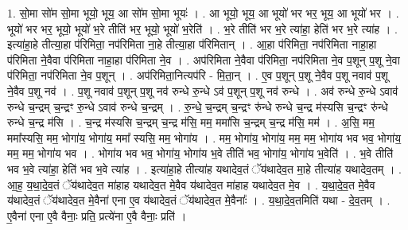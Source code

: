 \documentclass[17pt]{extarticle}
\begin{document}
1. सो॒मा सो॑म सो॒मा भूयो॒ भूय॒ आ सो॑म सो॒मा भूयः॑ । . आ भूयो॒ भूय॒ आ भूयो॑ भर भर॒ भूय॒ आ भूयो॑ भर । . भूयो॑ भर भर॒ भूयो॒ भूयो॑ भ॒रे तीति॑ भर॒ भूयो॒ भूयो॑ भ॒रेति॑ । . भ॒रे तीति॑ भर भ॒रे त्या॑हा॒ हेति॑ भर भ॒रे त्या॑ह । . इत्या॑हा॒हे तीत्या॒हा प॑रिमिता॒ नप॑रिमिता ना॒हे तीत्या॒हा प॑रिमितान् । . आ॒हा प॑रिमिता॒ नप॑रिमिता नाहा॒हा प॑रिमिता ने॒वैवा प॑रिमिता नाहा॒हा प॑रिमिता ने॒व । . अप॑रिमिता ने॒वैवा प॑रिमिता॒ नप॑रिमिता ने॒व प॒शून् प॒शू ने॒वा प॑रिमिता॒ नप॑रिमिता ने॒व प॒शून् । . अप॑रिमिता॒नित्यप॑रि - मि॒ता॒न् । . ए॒व प॒शून् प॒शू ने॒वैव प॒शू नवाव॑ प॒शू ने॒वैव प॒शू नव॑ । . प॒शू नवाव॑ प॒शून् प॒शू नव॑ रुन्धे रु॒न्धे ऽव॑ प॒शून् प॒शू नव॑ रुन्धे । . अव॑ रुन्धे रु॒न्धे ऽवाव॑ रुन्धे च॒न्द्रम् च॒न्द्रꣳ रु॒न्धे ऽवाव॑ रुन्धे च॒न्द्रम् । . रु॒न्धे॒ च॒न्द्रम् च॒न्द्रꣳ रु॑न्धे रुन्धे च॒न्द्र म॑स्यसि च॒न्द्रꣳ रु॑न्धे रुन्धे च॒न्द्र म॑सि । . च॒न्द्र म॑स्यसि च॒न्द्रम् च॒न्द्र म॑सि॒ मम॒ ममा॑सि च॒न्द्रम् च॒न्द्र म॑सि॒ मम॑ । . अ॒सि॒ मम॒ ममा᳚स्यसि॒ मम॒ भोगा॑य॒ भोगा॑य॒ ममा᳚ स्यसि॒ मम॒ भोगा॑य । . मम॒ भोगा॑य॒ भोगा॑य॒ मम॒ मम॒ भोगा॑य भव भव॒ भोगा॑य॒ मम॒ मम॒ भोगा॑य भव । . भोगा॑य भव भव॒ भोगा॑य॒ भोगा॑य भ॒वे तीति॑ भव॒ भोगा॑य॒ भोगा॑य भ॒वेति॑ । . भ॒वे तीति॑ भव भ॒वे त्या॑हा॒ हेति॑ भव भ॒वे त्या॑ह । . इत्या॑हा॒हे तीत्या॑ह यथादेव॒तं ॅय॑थादेव॒त मा॒हे तीत्या॑ह यथादेव॒तम् । . आ॒ह॒ य॒था॒दे॒व॒तं ॅय॑थादेव॒त मा॑हाह यथादेव॒त मे॒वैव य॑थादेव॒त मा॑हाह यथादेव॒त मे॒व । . य॒था॒दे॒व॒त मे॒वैव य॑थादेव॒तं ॅय॑थादेव॒त मे॒वैना॑ एना ए॒व य॑थादेव॒तं ॅय॑थादेव॒त मे॒वैनाः᳚ । . य॒था॒दे॒व॒तमिति॑ यथा - दे॒व॒तम् । . ए॒वैना॑ एना ए॒वै वैनाः॒ प्रति॒ प्रत्ये॑ना ए॒वै वैनाः॒ प्रति॑ । \newline
\end{document}
